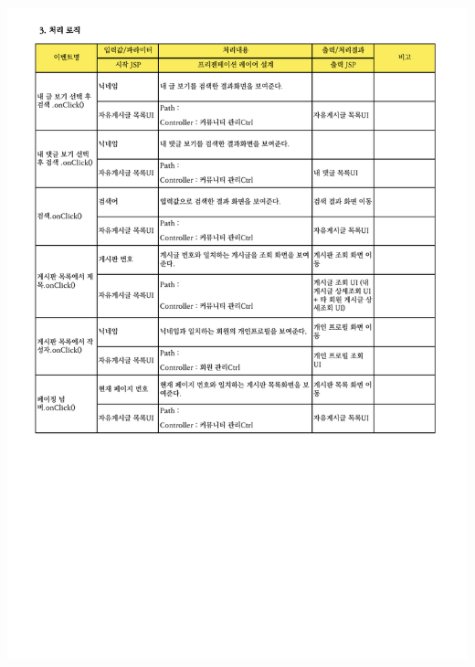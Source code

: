 {{{{{{{{{{{{{{{{{{{{{{{{{{{{{{{{{{{{{{{{{{{{{\includegraphics[width=20cm]{./Figure/Analysis/Display/community/community_04.pdf} \\
}}}}}}}}}}}}}}}}}}}}}}}}}}}}}}}}}}}}}}}}}}}}}

